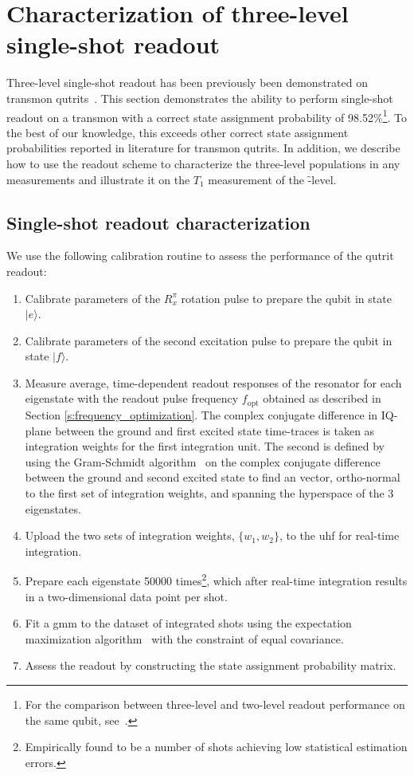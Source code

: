 \section{Characterization of three-level single-shot readout} \label{s:experimental_data}
Three-level single-shot readout has been previously been demonstrated on transmon qutrits~\cite{Kurpiers2018DeterministicPhotons, Magnard2018FastQubit}. This section demonstrates the ability to perform single-shot readout on a transmon with a correct state assignment probability of 98.52\%\footnote{For the comparison between three-level and two-level readout performance on the same qubit, see~\cite{Lacroix2019}.}. To the best of our knowledge, this exceeds other correct state assignment probabilities reported in literature for transmon qutrits. In addition, we describe how to use the readout scheme to characterize the three-level populations in any measurements and illustrate it on the  $T_1$ measurement of the \f-level.

\subsection{Single-shot readout characterization} \label{sec:qutrit_readout_ro_characterization}
We use the following calibration routine to assess the performance of the qutrit readout:
\begin{enumerate}
    \item Calibrate parameters of the $R^{\pi}_x$ rotation pulse to prepare the qubit in state $|e\rangle$. 
    \item Calibrate parameters of the second excitation pulse to prepare the qubit in state $|f\rangle$.
    \item Measure average, time-dependent readout responses of the resonator for each eigenstate with the readout pulse frequency $f_{\mathrm{opt}}$ obtained as described in Section \ref{s:frequency_optimization}. The complex conjugate difference in IQ-plane between the ground and first excited state time-traces is taken as integration weights for the first integration unit. The second is defined by using the Gram-Schmidt algorithm~\cite{Bjorck1994NumericsOrthogonalization} on the complex conjugate difference between the ground and second excited state to find an vector, ortho-normal to the first set of integration weights, and spanning the hyperspace of the 3 eigenstates. 
    \item Upload the two sets of integration weights,  $\{w_1, w_2\}$, to the \gls{uhf} for real-time integration.
    \item Prepare each eigenstate 50000 times\footnote{Empirically found to be a  number of shots achieving low statistical estimation errors.}, which after real-time integration results in a two-dimensional data point per shot.
    \item Fit a \gls{gmm} to the dataset of integrated shots using the expectation maximization algorithm~\cite[p.~434-439]{Bishop2006} with the constraint of equal covariance. 
    \item Assess the readout by constructing the state assignment probability matrix.
\end{enumerate}

